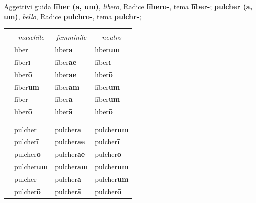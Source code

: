 \documentclass[nols]{tufte-handout}
\newcommand{\nom}{\textsc{nom}\xspace}
\newcommand{\gen}{\textsc{gen}\xspace}
\newcommand{\dat}{\textsc{dat}\xspace}
\newcommand{\acc}{\textsc{acc}\xspace}
\newcommand{\voc}{\textsc{voc}\xspace}
\newcommand{\abl}{\textsc{abl}\xspace}
\newcommand{\textls}[2][5]{%
    \begingroup\addfontfeatures{LetterSpace=#1}#2\endgroup
  }
\renewcommand{\smallcapsspacing}[1]{\textls[10]{#1}}
\renewcommand{\textsc}[1]{\smallcapsspacing{\textsmallcaps{#1}}}
\begin{document}
 Aggettivi guida \textbf{līber (a, um)}, \textit{libero}, Radice \textbf{lībero-}, tema \textbf{līber-}; 
\textbf{pulcher (a, um)}, \textit{bello}, Radice \textbf{pulchro-}, tema \textbf{pulchr-}; 

\begin{fullwidth}
\begin{table}[!htbp]
  \centering
  \begin{tabular}{l l l l}
	& \multicolumn{3}{c}{\textsc{līber, singolare}} \\
	
	& \multicolumn{1}{c}{\textit{maschile}} & \multicolumn{1}{c}{\textit{femminile}} & \multicolumn{1}{c}{\textit{neutro}} \\ 
	
    \nom & līber           & līber\textbf{a} & līber\textbf{um} \\
    \gen & līber\textbf{ī} & līber\textbf{ae} & līber\textbf{ī} \\
    \dat & līber\textbf{ō} & līber\textbf{ae} & līber\textbf{ō} \\
    \acc & līber\textbf{um}  & līber\textbf{am} & līber\textbf{um} \\
    \voc & līber           & līber\textbf{a} & līber\textbf{um} \\
    \abl & līber\textbf{ō}   & līber\textbf{ā} & līber\textbf{ō} \\
	
	\multicolumn{4}{c}{\textemdash} \\
	
	& \multicolumn{3}{c}{\textsc{pulcher, singolare}} \\

    \nom & pulcher           & pulcher\textbf{a} & pulcher\textbf{um} \\
    \gen & pulcher\textbf{ī} & pulcher\textbf{ae} & pulcher\textbf{ī} \\
    \dat & pulcher\textbf{ō} & pulcher\textbf{ae} & pulcher\textbf{ō} \\
    \acc & pulcher\textbf{um}  & pulcher\textbf{am} & pulcher\textbf{um} \\
    \voc & pulcher           & pulcher\textbf{a} & pulcher\textbf{um} \\
    \abl & pulcher\textbf{ō}   & pulcher\textbf{ā} & pulcher\textbf{ō} \\
	
  \end{tabular}
  \label{tab:normaltab}
\end{table}
\end{fullwidth}
\end{document}
